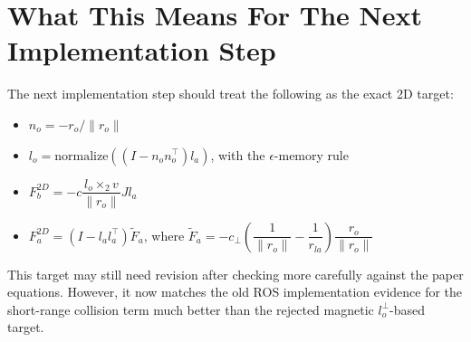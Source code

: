 \documentclass[11pt]{article}
\begin{document}
\section*{What This Means For The Next Implementation Step}

The next implementation step should treat the following as the exact 2D target:

\begin{itemize}[leftmargin=*]
  \item \(n_o = -r_o/\lVert r_o \rVert\)
  \item \(l_o = \mathrm{normalize}\!\left((I-n_on_o^\top)l_a\right)\), with the
  \(\epsilon\)-memory rule
  \item \(F_b^{2D} = -c \dfrac{l_o \times_2 v}{\lVert r_o \rVert} J l_a\)
  \item \(F_a^{2D} = \left(I-l_a l_a^\top\right)\tilde{F}_a\), where
  \(\tilde{F}_a = -c_\perp\left(\dfrac{1}{\lVert r_o \rVert} -
  \dfrac{1}{r_{la}}\right)\dfrac{r_o}{\lVert r_o \rVert}\)
\end{itemize}

This target may still need revision after checking more carefully against the
paper equations. However, it now matches the old ROS implementation evidence
for the short-range collision term much better than the rejected magnetic
\(l_o^\perp\)-based target.
\end{document}
